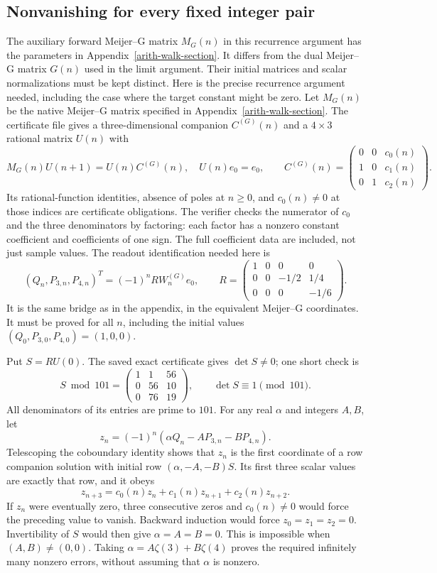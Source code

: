 \documentclass[11pt]{article}
\begin{document}
\subsection{Nonvanishing for every fixed integer pair}
The auxiliary forward Meijer--G matrix $M_G(n)$ in this recurrence
argument has the parameters in Appendix~\ref{arith-walk-section}.
It differs from the dual Meijer--G matrix $G(n)$ used in the limit
argument. Their initial matrices and scalar normalizations must be
kept distinct.
Here is the precise recurrence argument needed, including the case
where the target constant might be zero. Let $M_G(n)$ be the native
Meijer--G matrix specified in Appendix~\ref{arith-walk-section}.
The certificate file gives a three-dimensional companion $C^{(G)}(n)$
and a $4\times3$ rational matrix $U(n)$ with
\[
 M_G(n)U(n+1)=U(n)C^{(G)}(n),\quad U(n)e_0=e_0,\qquad
 C^{(G)}(n)=\begin{pmatrix}0&0&c_0(n)\\1&0&c_1(n)\\0&1&c_2(n)\end{pmatrix}.
\]
Its rational-function identities, absence of poles at $n\geq0$, and
$c_0(n)\ne0$ at those indices are certificate obligations. The verifier
checks the numerator of $c_0$ and the three denominators by factoring:
each factor has a nonzero constant coefficient and coefficients of one
sign. The full coefficient data are included, not just sample values.
The readout identification needed here is
\[
 (Q_n,P_{3,n},P_{4,n})^T=(-1)^n R W_n^{(G)}e_0,\qquad
 R=\begin{pmatrix}1&0&0&0\\0&0&-1/2&1/4\\0&0&0&-1/6\end{pmatrix}.
\]
It is the same bridge as in the appendix, in the equivalent Meijer--G
coordinates. It must be proved for all $n$, including the initial
values $(Q_0,P_{3,0},P_{4,0})=(1,0,0)$.

Put $S=RU(0)$. The saved exact certificate gives $\det S\ne0$;
one short check is
\[
 S\bmod101=\begin{pmatrix}1&1&56\\0&56&10\\0&76&19\end{pmatrix},
 \qquad\det S\equiv1\pmod{101}.
\]
All denominators of its entries are prime to $101$.
For any real $\alpha$ and integers $A,B$, let
\[
 z_n=(-1)^n(\alpha Q_n-AP_{3,n}-BP_{4,n}).
\]
Telescoping the coboundary identity shows that $z_n$ is the first
coordinate of a row companion solution with initial row
$(\alpha,-A,-B)S$. Its first three scalar values are exactly that row,
and it obeys
\[
 z_{n+3}=c_0(n)z_n+c_1(n)z_{n+1}+c_2(n)z_{n+2}.
\]
If $z_n$ were eventually zero, three consecutive zeros and $c_0(n)\ne0$
would force the preceding value to vanish. Backward induction would
force $z_0=z_1=z_2=0$. Invertibility of $S$ would then give
$\alpha=A=B=0$. This is impossible when $(A,B)\ne(0,0)$.
Taking $\alpha=A\zeta(3)+B\zeta(4)$ proves the required infinitely many
nonzero errors, without assuming that $\alpha$ is nonzero.
\end{document}
